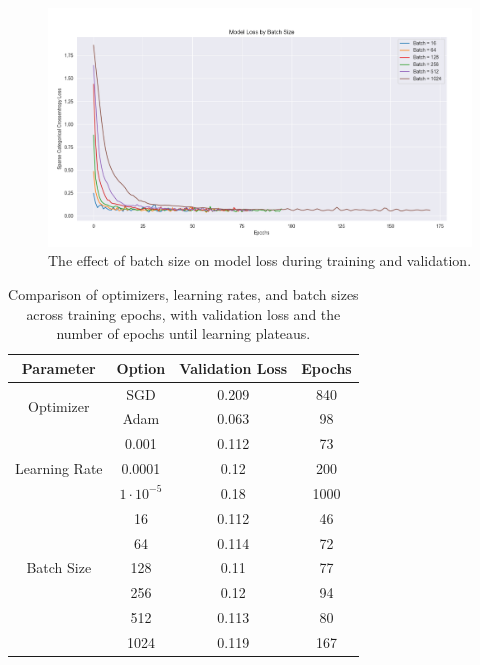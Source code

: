 \begin{figure}[h]
	\centering
	\includegraphics[width=\textwidth]{images/batch_sizes_comparison.png}
	\caption{The effect of batch size on model loss during training and validation.}
	\label{fig:batch_sizes}
\end{figure}


\begin{table}[ht!]
	\centering
		\caption{Comparison of optimizers, learning rates, and batch sizes across training epochs, with validation loss and the number of epochs until learning plateaus.}
	\begin{tabular}{|c|c|c|c|}
		\hline
		\textbf{Parameter} & \textbf{Option} & \textbf{Validation Loss} & \textbf{Epochs} \\
		\hline
		\multirow{2}{*}{Optimizer} & SGD & 0.209 & 840 \\
		\cline{2-4}
		& Adam & 0.063 & 98 \\
		\hline
		\multirow{3}{*}{Learning Rate} & 0.001 & 0.112 & 73 \\
		\cline{2-4}
		& 0.0001 & 0.12 & 200 \\
		\cline{2-4}
		& $1\cdot10^{-5}$&0.18 & 1000 \\
		\hline
		\multirow{5}{*}{Batch Size} & 16 & 0.112 & 46 \\
		\cline{2-4}
		& 64 & 0.114 & 72 \\
		\cline{2-4}
		& 128 &  0.11& 77 \\
		\cline{2-4}
		& 256 &  0.12  & 94 \\
		\cline{2-4}
		& 512 & 0.113 & 80 \\
		\cline{2-4}
		& 1024 & 0.119 & 167 \\
		\hline
	\end{tabular}

	\label{tab:comparison_across_epochs}
\end{table}




